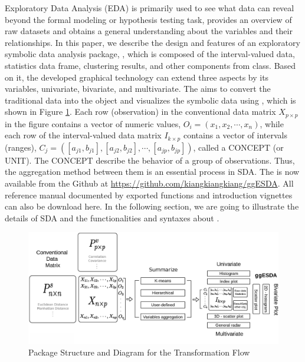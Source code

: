 \documentclass[article]{jss}
\begin{document}
Exploratory Data Analysis (EDA) \cite{Tukey:1977} is primarily used to see what data can reveal beyond the formal modeling or hypothesis testing task, provides an overview of raw datasets and obtains a general understanding about the variables and their relationships. In this paper, we describe the design and features of an exploratory  symbolic data analysis package, , which is composed of the interval-valued data, statistics data frame, clustering results, and other components from  \cite{R6} class. Based on it, the developed graphical technology can extend three aspects by its variables, univariate, bivariate, and multivariate. The  aims to convert the traditional data into the  object and visualizes the symbolic data using , which is shown in Figure \ref{fig:pkgStr}. Each row (observation) in the conventional data matrix $X_{p \times p}$ in the figure contains a vector of numeric values, $O_i = (x_1,x_2,\cdots,x_n)$, while each row of the interval-valued data matrix $I_{k \times p}$ contains a vector of intervals (ranges), $C_j = ([a_{j1},b_{j1}],[a_{j2},b_{j2}],\cdots,[a_{jp},b_{jp}])$, called a CONCEPT (or UNIT). The CONCEPT describe the behavior of a group of observations. Thus, the aggregation method between them is an essential process in SDA. The  is now available from the Github at \url{https://github.com/kiangkiangkiang/ggESDA}. All reference manual documented by exported functions and introduction vignettes can also be download here. In the following section, we are going to illustrate the details of SDA and the functionalities and syntaxes about .

\begin{figure}[h]	
  		\centering	 			 	
 	 		\includegraphics[width=1\textwidth]{doc/packageStructure2.eps} 
  		\caption{Package Structure and Diagram for the Transformation Flow} 
  		\label{fig:pkgStr}   			 		 
\end{figure}
\end{document}
